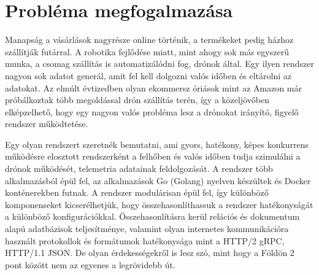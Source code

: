 
\section{Probléma megfogalmazása}
Manapság a vásárlások nagyrésze online történik, a termékeket pedig házhoz szállítják futárral.
A robotika fejlődése miatt, mint ahogy sok más egyszerű munka, a csomag szállítás is automatizálódni fog, drónok által.
Egy ilyen rendszer nagyon sok adatot generál, amit fel kell dolgozni valós időben és eltárolni az adatokat.
Az elmúlt évtizedben olyan ekommersz óriások mint az Amazon már próbálkoztak több megoldással drón szállítás terén, így a közeljövőben elképzelhető, hogy egy nagyon valós probléma lesz a drónokat irányító, figyelő rendszer működtetése.

Egy olyan rendszert szeretnék bemutatni, ami gyors, hatékony, képes konkurrens működésre elosztott rendszerként a felhőben és valós időben tudja szimulálni a drónok működését, telemetria adatainak feldolgozását.
A rendszer több alkalmazásból épül fel, az alkalmazások Go (Golang) nyelven készültek és Docker konténerekben futnak.
A rendszer modulárisan épül fel, így különböző komponenseket kicserélhetjük, hogy összehasonlíthassuk a rendszer hatékonyságát a különböző konfigurációkkal.
Összehasonlításra kerül relációs és dokumentum alapú adatbázisok teljesítménye, valamint olyan internetes kommunikációra használt protokollok és formátumok hatékonysága mint a HTTP/2 gRPC, HTTP/1.1 JSON.
De olyan érdekességekről is lesz szó, mint hogy a Földön 2 pont között nem az egyenes a legrövidebb út.



